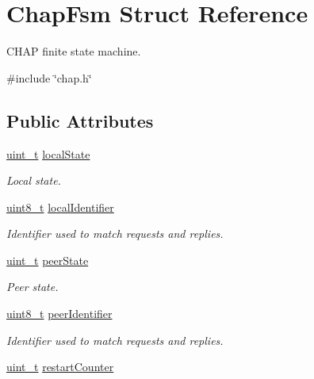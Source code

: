 \hypertarget{structChapFsm}{}\section{Chap\+Fsm Struct Reference}
\label{structChapFsm}


C\+H\+AP finite state machine.  




{\ttfamily \#include \char`\"{}chap.\+h\char`\"{}}

\subsection*{Public Attributes}
\begin{DoxyCompactItemize}
\item 
\hyperlink{compiler__port_8h_a12a1e9b3ce141648783a82445d02b58d}{uint\+\_\+t} \hyperlink{structChapFsm_a5a6377b76313a2d26c803a7f9eeab9d0}{local\+State}
\begin{DoxyCompactList}\small\item\em Local state. \end{DoxyCompactList}\item 
\hyperlink{stdint_8h_aba7bc1797add20fe3efdf37ced1182c5}{uint8\+\_\+t} \hyperlink{structChapFsm_a52f5787d2fa8be42a8c4855248ecb861}{local\+Identifier}
\begin{DoxyCompactList}\small\item\em Identifier used to match requests and replies. \end{DoxyCompactList}\item 
\hyperlink{compiler__port_8h_a12a1e9b3ce141648783a82445d02b58d}{uint\+\_\+t} \hyperlink{structChapFsm_a9eb96e32ed5cbdd3a3d41570da93a145}{peer\+State}
\begin{DoxyCompactList}\small\item\em Peer state. \end{DoxyCompactList}\item 
\hyperlink{stdint_8h_aba7bc1797add20fe3efdf37ced1182c5}{uint8\+\_\+t} \hyperlink{structChapFsm_ac631bed2f88f031c848bd89aa97028bf}{peer\+Identifier}
\begin{DoxyCompactList}\small\item\em Identifier used to match requests and replies. \end{DoxyCompactList}\item 
\hyperlink{compiler__port_8h_a12a1e9b3ce141648783a82445d02b58d}{uint\+\_\+t} \hyperlink{structChapFsm_ac4757119b770f5462c78faf8567262ef}{restart\+Counter}

\end{DoxyCompactItemize}
